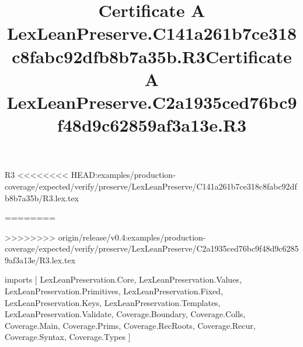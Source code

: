 \begin{lexlean}{R3}
<<<<<<<< HEAD:examples/production-coverage/expected/verify/preserve/LexLeanPreserve/C141a261b7ce318c8fabc92dfb8b7a35b/R3.lex.tex
\title{Certificate A LexLeanPreserve.C141a261b7ce318c8fabc92dfb8b7a35b.R3}
========
\title{Certificate A LexLeanPreserve.C2a1935ced76bc9f48d9c62859af3a13e.R3}
>>>>>>>> origin/release/v0.4:examples/production-coverage/expected/verify/preserve/LexLeanPreserve/C2a1935ced76bc9f48d9c62859af3a13e/R3.lex.tex
\begin{coremodule}
imports [
  LexLeanPreservation.Core,
  LexLeanPreservation.Values,
  LexLeanPreservation.Primitives,
  LexLeanPreservation.Fixed,
  LexLeanPreservation.Keys,
  LexLeanPreservation.Templates,
  LexLeanPreservation.Validate,
  Coverage.Boundary,
  Coverage.Colls,
  Coverage.Main,
  Coverage.Prims,
  Coverage.RecRoots,
  Coverage.Recur,
  Coverage.Syntax,
  Coverage.Types
]


\end{coremodule}
\end{lexlean}
